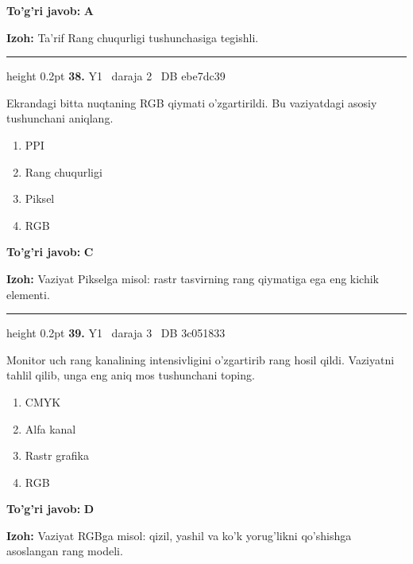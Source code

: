 \documentclass[10pt,a4paper,oneside]{article}
\begin{document}
\begin{tcolorbox}[enhanced,breakable,colback=teal!4,colframe=teal!45!black,boxrule=0.45pt,arc=1.2mm,left=2.8mm,right=2.8mm,top=2mm,bottom=2mm,before skip=2mm,after skip=2mm]
\textbf{\color{teal}To'g'ri javob:} \textbf{A}
\par\smallskip
\textbf{Izoh:} Ta'rif Rang chuqurligi tushunchasiga tegishli.
\end{tcolorbox}
\vspace{2mm}\hrule height 0.2pt \vspace{4mm}
\hypertarget{q38}{\textbf{\color{ink}38.}}  {\color{muted}\scriptsize Y1 \textbullet\ daraja 2 \textbullet\ DB ebe7dc39}
\par
Ekrandagi bitta nuqtaning RGB qiymati o'zgartirildi. Bu vaziyatdagi asosiy tushunchani aniqlang.
\begin{enumerate}[label=\Alph*),leftmargin=9mm]
\item PPI
\item Rang chuqurligi
\item Piksel
\item RGB
\end{enumerate}
\begin{tcolorbox}[enhanced,breakable,colback=teal!4,colframe=teal!45!black,boxrule=0.45pt,arc=1.2mm,left=2.8mm,right=2.8mm,top=2mm,bottom=2mm,before skip=2mm,after skip=2mm]
\textbf{\color{teal}To'g'ri javob:} \textbf{C}
\par\smallskip
\textbf{Izoh:} Vaziyat Pikselga misol: rastr tasvirning rang qiymatiga ega eng kichik elementi.
\end{tcolorbox}
\vspace{2mm}\hrule height 0.2pt \vspace{4mm}
\hypertarget{q39}{\textbf{\color{ink}39.}}  {\color{muted}\scriptsize Y1 \textbullet\ daraja 3 \textbullet\ DB 3c051833}
\par
Monitor uch rang kanalining intensivligini o'zgartirib rang hosil qildi. Vaziyatni tahlil qilib, unga eng aniq mos tushunchani toping.
\begin{enumerate}[label=\Alph*),leftmargin=9mm]
\item CMYK
\item Alfa kanal
\item Rastr grafika
\item RGB
\end{enumerate}
\begin{tcolorbox}[enhanced,breakable,colback=teal!4,colframe=teal!45!black,boxrule=0.45pt,arc=1.2mm,left=2.8mm,right=2.8mm,top=2mm,bottom=2mm,before skip=2mm,after skip=2mm]
\textbf{\color{teal}To'g'ri javob:} \textbf{D}
\par\smallskip
\textbf{Izoh:} Vaziyat RGBga misol: qizil, yashil va ko'k yorug'likni qo'shishga asoslangan rang modeli.
\end{tcolorbox}
\end{document}
